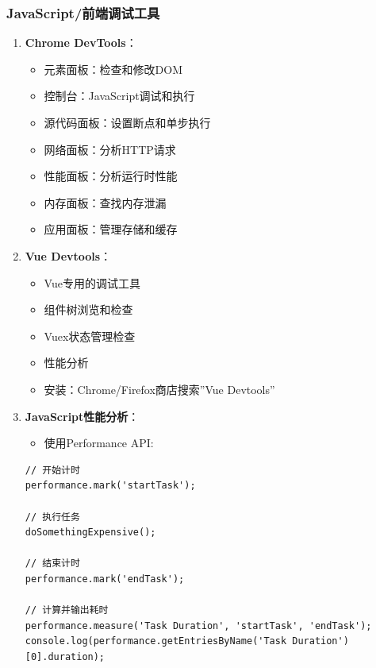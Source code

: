 \subsubsection{JavaScript/前端调试工具}\label{javascriptux524dux7aefux8c03ux8bd5ux5de5ux5177}

\begin{enumerate}
\def\labelenumi{\arabic{enumi}.}
\tightlist
\item
  \textbf{Chrome DevTools}：

  \begin{itemize}
  \tightlist
  \item
    元素面板：检查和修改DOM
  \item
    控制台：JavaScript调试和执行
  \item
    源代码面板：设置断点和单步执行
  \item
    网络面板：分析HTTP请求
  \item
    性能面板：分析运行时性能
  \item
    内存面板：查找内存泄漏
  \item
    应用面板：管理存储和缓存
  \end{itemize}
\item
  \textbf{Vue Devtools}：

  \begin{itemize}
  \tightlist
  \item
    Vue专用的调试工具
  \item
    组件树浏览和检查
  \item
    Vuex状态管理检查
  \item
    性能分析
  \item
    安装：Chrome/Firefox商店搜索''Vue Devtools''
  \end{itemize}
\item
  \textbf{JavaScript性能分析}：

  \begin{itemize}
  \tightlist
  \item
    使用Performance API:
  \end{itemize}

\begin{lstlisting}
// 开始计时
performance.mark('startTask');

// 执行任务
doSomethingExpensive();

// 结束计时
performance.mark('endTask');

// 计算并输出耗时
performance.measure('Task Duration', 'startTask', 'endTask');
console.log(performance.getEntriesByName('Task Duration')[0].duration);
\end{lstlisting}
\end{enumerate}

